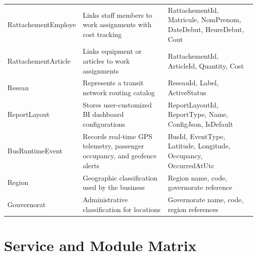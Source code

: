 \begin{longtable}{p{3.5cm}p{4.6cm}p{5.4cm}}
RattachementEmploye & Links staff members to work assignments with cost tracking & RattachementId, Matricule, NomPrenom, DateDebut, HeureDebut, Cout \\
RattachementArticle & Links equipment or articles to work assignments & RattachementId, ArticleId, Quantity, Cost \\
Reseau & Represents a transit network routing catalog & ReseauId, Label, ActiveStatus \\
ReportLayout & Stores user-customized BI dashboard configurations & ReportLayoutId, ReportType, Name, ConfigJson, IsDefault \\
BusRuntimeEvent & Records real-time GPS telemetry, passenger occupancy, and geofence alerts & BusId, EventType, Latitude, Longitude, Occupancy, OccurredAtUtc \\
Region & Geographic classification used by the business & Region name, code, governorate reference \\
Gouvernorat & Administrative classification for locations & Governorate name, code, region references \\
\end{longtable}
\normalsize

\section{Service and Module Matrix}

